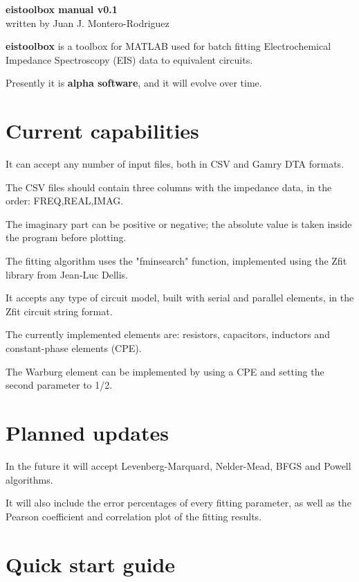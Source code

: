 \documentclass[10pt,a4paper]{article}
\begin{document}
\setlength{\parindent}{0pt}

\begin{center}
	\textbf{eistoolbox manual v0.1}\\
	written by Juan J. Montero-Rodriguez
\end{center}

\textbf{eistoolbox} is a toolbox for MATLAB\textregistered{} used for batch fitting Electrochemical Impedance Spectroscopy (EIS) data to equivalent circuits. 

Presently it is \textbf{alpha software}, and it will evolve over time.

\section{Current capabilities}

It can accept any number of input files, both in CSV and Gamry DTA formats.

The CSV files should contain three columns with the impedance data, in the order: FREQ,REAL,IMAG. 

The imaginary part can be positive or negative; the absolute value is taken inside the program before plotting.

The fitting algorithm uses the "fminsearch" function, implemented using the Zfit library from Jean-Luc Dellis. 

It accepts any type of circuit model, built with serial and parallel elements, in the Zfit circuit string format.

The currently implemented elements are: resistors, capacitors, inductors and constant-phase elements (CPE). 

The Warburg element can be implemented by using a CPE and setting the second parameter to 1/2.





\section{Planned updates}

In the future it will accept Levenberg-Marquard, Nelder-Mead, BFGS and Powell algorithms.

It will also include the error percentages of every fitting parameter, as well as the Pearson coefficient and correlation plot of the fitting results.

\newpage
\section{Quick start guide}
\end{document}
